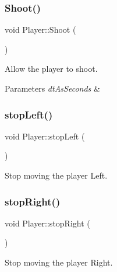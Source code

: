 \mbox{\label{class_player_a2105394431517a41d38140cb65982331}} 
\subsubsection{\texorpdfstring{Shoot()}{Shoot()}}
{\footnotesize\ttfamily void Player\+::\+Shoot (\begin{DoxyParamCaption}{ }\end{DoxyParamCaption})}



Allow the player to shoot. 


\begin{DoxyParams}{Parameters}
{\em dt\+As\+Seconds} & \\
\hline
\end{DoxyParams}
\mbox{\label{class_player_aa150f941486096bb63cc67eabec9046c}} 
\subsubsection{\texorpdfstring{stop\+Left()}{stopLeft()}}
{\footnotesize\ttfamily void Player\+::stop\+Left (\begin{DoxyParamCaption}{ }\end{DoxyParamCaption})}



Stop moving the player Left. 

\mbox{\label{class_player_afebb6b7ca7210e7b1aa2c9ee4ff75b0e}} 
\subsubsection{\texorpdfstring{stop\+Right()}{stopRight()}}
{\footnotesize\ttfamily void Player\+::stop\+Right (\begin{DoxyParamCaption}{ }\end{DoxyParamCaption})}



Stop moving the player Right. 

\mbox{\label{class_player_aaccee569406f6180bd5028d058b8579f}} 

